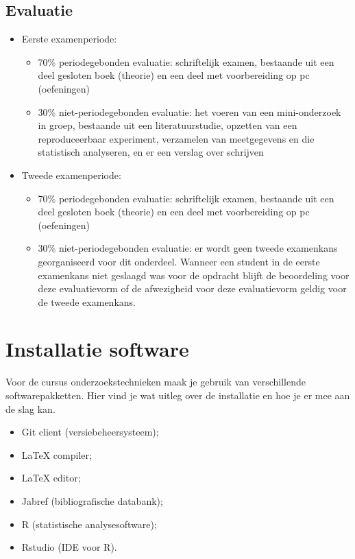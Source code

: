 \subsection{Evaluatie}



\begin{itemize}
  \item Eerste examenperiode:
  \begin{itemize}
    \item 70\% periodegebonden evaluatie: schriftelijk examen, bestaande uit een deel gesloten boek (theorie) en een deel met voorbereiding op pc (oefeningen)
    \item 30\% niet-periodegebonden evaluatie: het voeren van een mini-onderzoek in groep, bestaande uit een literatuurstudie, opzetten van een reproduceerbaar experiment, verzamelen van meetgegevens en die statistisch analyseren, en er een verslag over schrijven
  \end{itemize}
  \item Tweede examenperiode:
  \begin{itemize}
    \item 70\% periodegebonden evaluatie: schriftelijk examen, bestaande uit een deel gesloten boek (theorie) en een deel met voorbereiding op pc (oefeningen)
    \item 30\% niet-periodegebonden evaluatie: er wordt geen tweede examenkans georganiseerd voor dit onderdeel. Wanneer een student in de eerste examenkans niet geslaagd was voor de opdracht blijft de beoordeling voor deze evaluatievorm of de afwezigheid voor deze evaluatievorm geldig voor de tweede examenkans.
  \end{itemize}
\end{itemize}



\section{Installatie software}
\label{sec:installatie-software}

Voor de cursus onderzoekstechnieken maak je gebruik van verschillende softwarepakketten. Hier vind je wat uitleg over de installatie en hoe je er mee aan de slag kan.

\begin{itemize}
  \item Git client (versiebeheersysteem);
  \item \LaTeX{} compiler;
  \item \LaTeX{} editor;
  \item Jabref (bibliografische databank);
  \item R (statistische analysesoftware);
  \item Rstudio (IDE voor R).
\end{itemize}

